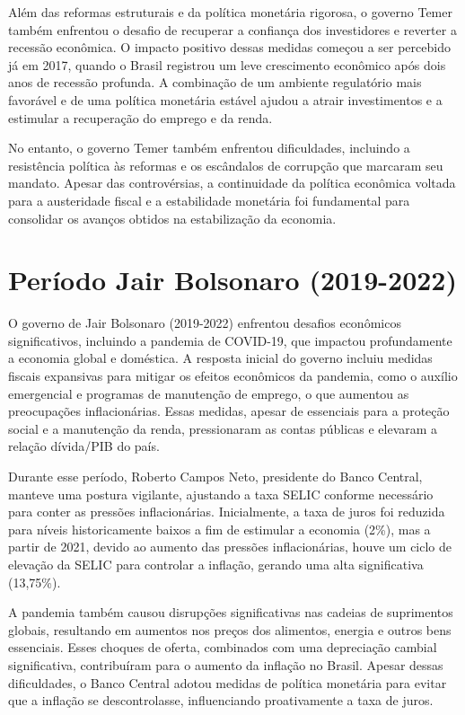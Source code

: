 \documentclass[12pt,oneside,a4paper,chapter=TITLE,english,brazil,sumario=abnt-6027-2012]{abntex2}
\begin{document}
Além das reformas estruturais e da política monetária rigorosa, o governo Temer também enfrentou o desafio de recuperar a confiança dos investidores e reverter a recessão econômica. O impacto positivo dessas medidas começou a ser percebido já em 2017, quando o Brasil registrou um leve crescimento econômico após dois anos de recessão profunda. A combinação de um ambiente regulatório mais favorável e de uma política monetária estável ajudou a atrair investimentos e a estimular a recuperação do emprego e da renda.

No entanto, o governo Temer também enfrentou dificuldades, incluindo a resistência política às reformas e os escândalos de corrupção que marcaram seu mandato. Apesar das controvérsias, a continuidade da política econômica voltada para a austeridade fiscal e a estabilidade monetária foi fundamental para consolidar os avanços obtidos na estabilização da economia.

\section{Período Jair Bolsonaro (2019-2022)}

O governo de Jair Bolsonaro (2019-2022) enfrentou desafios econômicos significativos, incluindo a pandemia de COVID-19, que impactou profundamente a economia global e doméstica. A resposta inicial do governo incluiu medidas fiscais expansivas para mitigar os efeitos econômicos da pandemia, como o auxílio emergencial e programas de manutenção de emprego, o que aumentou as preocupações inflacionárias. Essas medidas, apesar de essenciais para a proteção social e a manutenção da renda, pressionaram as contas públicas e elevaram a relação dívida/PIB do país.

Durante esse período, Roberto Campos Neto, presidente do Banco Central, manteve uma postura vigilante, ajustando a taxa SELIC conforme necessário para conter as pressões inflacionárias. Inicialmente, a taxa de juros foi reduzida para níveis historicamente baixos a fim de estimular a economia (2\%), mas a partir de 2021, devido ao aumento das pressões inflacionárias, houve um ciclo de elevação da SELIC para controlar a inflação, gerando uma alta significativa (13,75\%).

A pandemia também causou disrupções significativas nas cadeias de suprimentos globais, resultando em aumentos nos preços dos alimentos, energia e outros bens essenciais. Esses choques de oferta, combinados com uma depreciação cambial significativa, contribuíram para o aumento da inflação no Brasil. Apesar dessas dificuldades, o Banco Central adotou medidas de política monetária para evitar que a inflação se descontrolasse, influenciando proativamente a taxa de juros.
\end{document}
